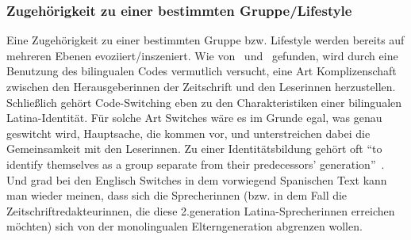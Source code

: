\subsubsection{Zugehörigkeit zu einer bestimmten Gruppe/Lifestyle}
Eine Zugehörigkeit zu einer bestimmten Gruppe bzw. Lifestyle werden bereits auf mehreren Ebenen evoziiert/inszeniert.
Wie von~\cite{Ticknor12} und~\cite{Mahootian05} gefunden, wird durch eine Benutzung des bilingualen Codes vermutlich versucht, eine Art Komplizenschaft zwischen den Herausgeberinnen der Zeitschrift und den Leserinnen herzustellen.
Schließlich gehört Code-Switching eben zu den Charakteristiken einer bilingualen Latina-Identität.
Für solche Art Switches wäre es im Grunde egal, was genau geswitcht wird, Hauptsache, die kommen vor, und unterstreichen dabei die Gemeinsamkeit mit den Leserinnen.
Zu einer Identitätsbildung gehört oft ``to identify themselves as a group separate from their predecessors’ generation''~\cite[]{Mahootian05}.
Und grad bei den Englisch Switches in dem vorwiegend Spanischen Text kann man wieder meinen, dass sich die Sprecherinnen (bzw. in dem Fall die Zeitschriftredakteurinnen, die diese 2.generation Latina-Sprecherinnen erreichen möchten) sich von der monolingualen Elterngeneration abgrenzen wollen.



\begin{comment}
Eckert:

``Once the agent isolates and attributes significance to a feature, that feautre becomes a resource that he or she can incorporate or not into his or her own style.''
--> Switching is identified as a resource by the publishers of the magazine

1st order indexicality/Indizes
Latinas

2nd order
bewusste Nutzung von bilingualen Codes von den Herausgeberinnen um sich als Latinas zu positionieren und diese anzusprechen; eine Sisterhood zu simulieren

3rd order
social mobility/prestige?
\end{comment}

